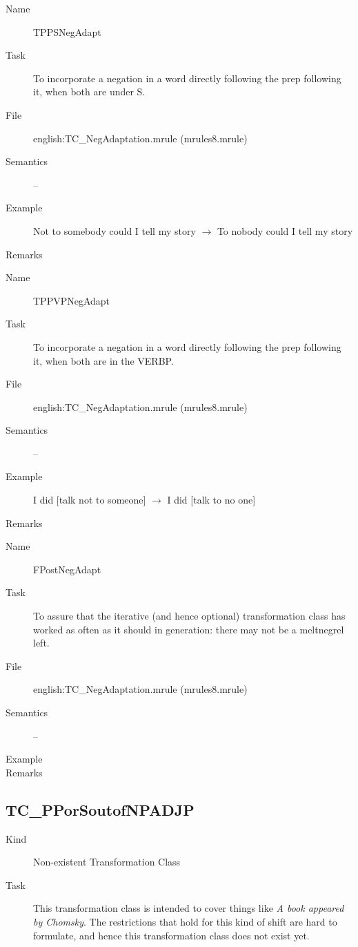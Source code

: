 \begin{description}
\vspace{1 cm}
\begin{description}
\item[Name] TPPSNegAdapt
\item[Task] To incorporate a negation in a word directly following the prep 
following it, when both are under S.
\item[File] english:TC\_NegAdaptation.mrule (mrules8.mrule)
\item[Semantics] --
\item[Example] Not to somebody could I tell my story $\rightarrow$ To nobody 
could I tell my story
\item[Remarks]
\end{description}

\vspace{1 cm}
\begin{description}
\item[Name] TPPVPNegAdapt
\item[Task] To incorporate a negation in a word directly following the prep 
following it, when both are in the VERBP.
\item[File] english:TC\_NegAdaptation.mrule (mrules8.mrule)
\item[Semantics] --
\item[Example] I did [talk not to someone] $\rightarrow$ I did [talk to no one]
\item[Remarks]
\end{description}

\vspace{1 cm}
\begin{description}
\item[Name] FPostNegAdapt
\item[Task] To assure that the iterative (and hence optional) transformation 
class has worked as often as it should in generation: there may not be a 
meltnegrel left.
\item[File] english:TC\_NegAdaptation.mrule (mrules8.mrule)
\item[Semantics] --
\item[Example] 
\item[Remarks]
\end{description}

\end{description}

\newpage
\subsection{TC\_PPorSoutofNPADJP}
\begin{description}
\item[Kind] Non-existent Transformation Class
\item[Task] This transformation class is intended to cover things like {
\em A book appeared by Chomsky\/}. The restrictions that hold for this kind of 
shift are hard to formulate, and hence this transformation class does 
not exist yet.
\end{description}

